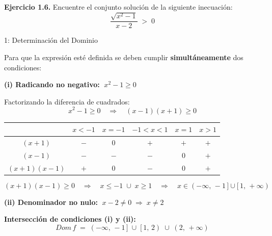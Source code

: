 \documentclass[letterpaper, 12pt]{article}
\begin{document}
\newpage

\begin{tcolorbox}[colback=azulFuerte!12, colframe=azulFuerte, arc=8pt,
    boxrule=1.2pt, enhanced]
    \textbf{\large Ejercicio 1.6.} \quad Encuentre el conjunto solución
    de la siguiente inecuación:
    \[
        \dfrac{\sqrt{x^2 - 1}}{x - 2} \;>\; 0
    \]
\end{tcolorbox}

\bigskip

\begin{paso}{1: Determinación del Dominio}

Para que la expresión esté definida se deben cumplir
\textbf{simultáneamente} dos condiciones:

\medskip
\textbf{(i) Radicando no negativo:} $\;x^2 - 1 \geq 0$

Factorizando la diferencia de cuadrados:
\[
    x^2 - 1 \geq 0 \quad\Longrightarrow\quad
    (x - 1)(x + 1) \geq 0
\]

\begin{center}
\renewcommand{\arraystretch}{1.5}
\begin{tabular}{c|ccccc}
    & $x < -1$ & $x=-1$ & $-1 < x < 1$ & $x=1$ & $x > 1$ \\
\hline
$(x + 1)$ & $-$ & $0$ & $+$ & $+$ & $+$ \\
$(x - 1)$ & $-$ & $-$ & $-$ & $0$ & $+$ \\
\hline
\rowcolor{celesteSuave}
$(x+1)(x-1)$ & $+$ & $0$ & $-$ & $0$ & $+$ \\
\end{tabular}
\end{center}

\[
    (x+1)(x-1) \geq 0 \quad\Longrightarrow\quad
    x \leq -1 \;\cup\; x \geq 1
    \quad\Longrightarrow\quad
    x \in (-\infty,\,-1\,] \cup [\,1,\,+\infty)
\]

\medskip
\textbf{(ii) Denominador no nulo:} $\;x - 2 \neq 0 \;\Rightarrow\; x \neq 2$

\medskip
\textbf{Intersección de condiciones (i) y (ii):}
\[
    \boxed{Dom\,f \;=\; (-\infty,\,-1\,] \;\cup\; [\,1,\,2) \;\cup\; (2,\,+\infty)}
\]

\end{paso}
\end{document}
